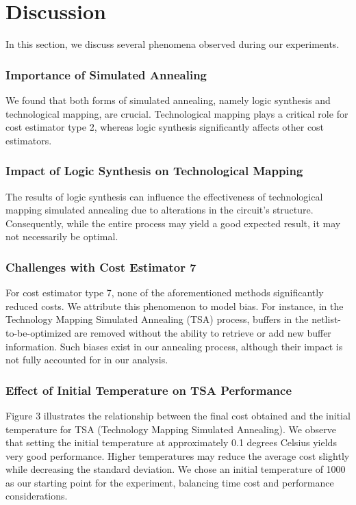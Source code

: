 \documentclass[conference]{IEEEtran}
\begin{document}
\section{Discussion}

In this section, we discuss several phenomena observed during our experiments.

\subsubsection{Importance of Simulated Annealing}
We found that both forms of simulated annealing, namely logic synthesis and technological mapping, are crucial. Technological mapping plays a critical role for cost estimator type 2, whereas logic synthesis significantly affects other cost estimators.

\subsubsection{Impact of Logic Synthesis on Technological Mapping}
The results of logic synthesis can influence the effectiveness of technological mapping simulated annealing due to alterations in the circuit's structure. Consequently, while the entire process may yield a good expected result, it may not necessarily be optimal.

\subsubsection{Challenges with Cost Estimator 7}
For cost estimator type 7, none of the aforementioned methods significantly reduced costs. We attribute this phenomenon to model bias. For instance, in the Technology Mapping Simulated Annealing (TSA) process, buffers in the netlist-to-be-optimized are removed without the ability to retrieve or add new buffer information. Such biases exist in our annealing process, although their impact is not fully accounted for in our analysis.

\subsubsection{Effect of Initial Temperature on TSA Performance}
Figure 3 illustrates the relationship between the final cost obtained and the initial temperature for TSA (Technology Mapping Simulated Annealing). We observe that setting the initial temperature at approximately 0.1 degrees Celsius yields very good performance. Higher temperatures may reduce the average cost slightly while decreasing the standard deviation. We chose an initial temperature of 1000 as our starting point for the experiment, balancing time cost and performance considerations.
\end{document}
